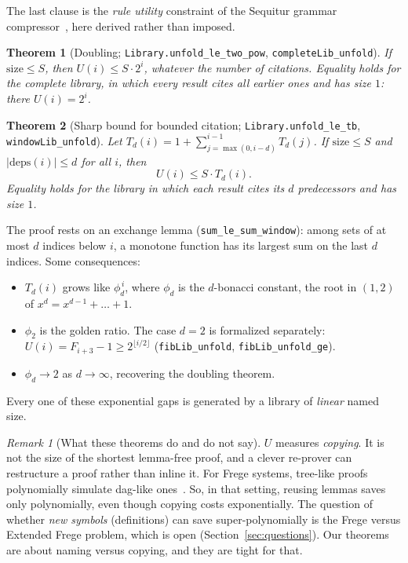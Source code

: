 \documentclass[11pt]{article}
\newtheorem{theorem}{Theorem}
\theoremstyle{remark}
\newtheorem*{remark}{Remark}
\newcommand{\lean}[1]{\texttt{#1}}
\begin{document}
\noindent The last clause is the \emph{rule utility} constraint of the Sequitur grammar
compressor~\cite{sequitur}, here derived rather than imposed.

\begin{theorem}[Doubling; \lean{Library.unfold\_le\_two\_pow}, \lean{completeLib\_unfold}]
If $\mathrm{size}\le S$, then $U(i)\le S\cdot 2^{i}$, whatever the number of citations.
Equality holds for the \emph{complete library}, in which every result cites all earlier
ones and has size $1$: there $U(i)=2^{i}$.
\end{theorem}

\begin{theorem}[Sharp bound for bounded citation; \lean{Library.unfold\_le\_tb}, \lean{windowLib\_unfold}]
Let $T_d(i)=1+\sum_{j=\max(0,i-d)}^{i-1}T_d(j)$. If $\mathrm{size}\le S$ and
$|\mathrm{deps}(i)|\le d$ for all $i$, then
\[
U(i)\le S\cdot T_d(i).
\]
Equality holds for the library in which each result cites its $d$ predecessors and has
size $1$.
\end{theorem}

\noindent The proof rests on an exchange lemma (\lean{sum\_le\_sum\_window}): among sets of
at most $d$ indices below $i$, a monotone function has its largest sum on the last $d$
indices. Some consequences:
\begin{itemize}
\item $T_d(i)$ grows like $\phi_d^{\,i}$, where $\phi_d$ is the $d$-bonacci constant, the
  root in $(1,2)$ of $x^d=x^{d-1}+\dots+1$.
\item $\phi_2$ is the golden ratio. The case $d=2$ is formalized separately: $U(i)=F_{i+3}-1\ge 2^{\lfloor i/2\rfloor}$
  (\lean{fibLib\_unfold}, \lean{fibLib\_unfold\_ge}).
\item $\phi_d\to 2$ as $d\to\infty$, recovering the doubling theorem.
\end{itemize}
Every one of these exponential gaps is generated by a library of \emph{linear} named size.

\begin{remark}[What these theorems do and do not say]
$U$ measures \emph{copying}. It is not the size of the shortest lemma-free proof, and a
clever re-prover can restructure a proof rather than inline it. For Frege systems,
tree-like proofs polynomially simulate dag-like ones~\cite{krajicek}. So, in that setting,
reusing lemmas saves only polynomially, even though copying costs exponentially. The
question of whether \emph{new symbols} (definitions) can save super-polynomially is the
Frege versus Extended Frege problem, which is open (Section~\ref{sec:questions}). Our
theorems are about naming versus copying, and they are tight for that.
\end{remark}
\end{document}
